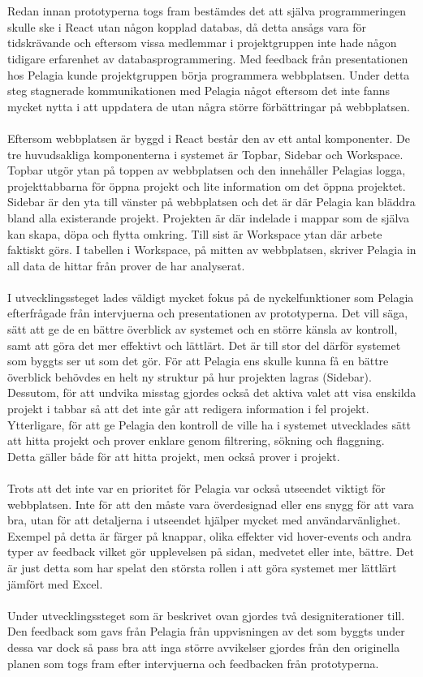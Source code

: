 \\
\\
Redan innan prototyperna togs fram bestämdes det att själva programmeringen skulle ske i React utan någon kopplad databas, då detta ansågs vara för tidskrävande och eftersom vissa medlemmar i projektgruppen inte hade någon tidigare erfarenhet av databasprogrammering. Med feedback från presentationen hos Pelagia kunde projektgruppen börja programmera webbplatsen. Under detta steg stagnerade kommunikationen med Pelagia något eftersom det inte fanns mycket nytta i att uppdatera de utan några större förbättringar på webbplatsen. 
\\
\\
Eftersom webbplatsen är byggd i React består den av ett antal komponenter. De tre huvudsakliga komponenterna i systemet är Topbar, Sidebar och Workspace. Topbar utgör ytan på toppen av webbplatsen och den innehåller Pelagias logga, projekttabbarna för öppna projekt och lite information om det öppna projektet. Sidebar är den yta till vänster på webbplatsen och det är där Pelagia kan bläddra bland alla existerande projekt. Projekten är där indelade i mappar som de själva kan skapa, döpa och flytta omkring. Till sist är Workspace ytan där arbete faktiskt görs. I tabellen i Workspace, på mitten av webbplatsen, skriver Pelagia in all data de hittar från prover de har analyserat.
\\
\\
I utvecklingssteget lades väldigt mycket fokus på de nyckelfunktioner som Pelagia efterfrågade från intervjuerna och presentationen av prototyperna. Det vill säga, sätt att ge de en bättre överblick av systemet och en större känsla av kontroll, samt att göra det mer effektivt och lättlärt. Det är till stor del därför systemet som byggts ser ut som det gör. För att Pelagia ens skulle kunna få en bättre överblick behövdes en helt ny struktur på hur projekten lagras (Sidebar). Dessutom, för att undvika misstag gjordes också det aktiva valet att visa enskilda projekt i tabbar så att det inte går att redigera information i fel projekt. Ytterligare, för att ge Pelagia den kontroll de ville ha i systemet utvecklades sätt att hitta projekt och prover enklare genom filtrering, sökning och flaggning. Detta gäller både för att hitta projekt, men också prover i projekt.
\\
\\
Trots att det inte var en prioritet för Pelagia var också utseendet viktigt för webbplatsen. Inte för att den måste vara överdesignad eller ens snygg för att vara bra, utan för att detaljerna i utseendet hjälper mycket med användarvänlighet. Exempel på detta är färger på knappar, olika effekter vid hover-events och andra typer av feedback vilket gör upplevelsen på sidan, medvetet eller inte, bättre. Det är just detta som har spelat den största rollen i att göra systemet mer lättlärt jämfört med Excel.
\\
\\
Under utvecklingssteget som är beskrivet ovan gjordes två designiterationer till. Den feedback som gavs från Pelagia från uppvisningen av det som byggts under dessa var dock så pass bra att inga större avvikelser gjordes från den originella planen som togs fram efter intervjuerna och feedbacken från prototyperna.